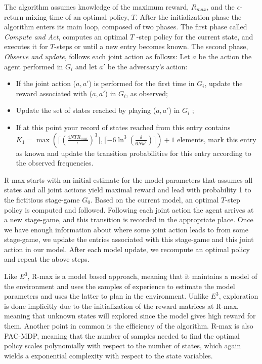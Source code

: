 The algorithm assumes knowledge of the maximum reward, $R_{max}$, and the $\epsilon$-return mixing time of an optimal policy, $T$. After the initialization phase the algorithm enters its main loop, composed of two phases. The first phase called \emph{Compute and Act}, computes an optimal $T$ -step policy for the current state, and executes it for $T$-steps or until a new entry becomes known. The second phase, \emph{Observe and update}, follows each joint action as follows: Let $a$ be the action the agent performed in $G_i$ and let $a'$ be the adversary's action:
\begin{itemize}
\item If the joint action ($a,a'$) is performed for the first time in $G_i$, update the reward associated with ($a,a'$) in $G_i$, as observed;
\item Update the set of states reached by playing ($a,a′$) in $G_i$ ;
\item If at this point your record of states reached from this entry contains \\ $K_1=\max \left( \lceil (\frac{4NTR_{max}}{\epsilon})^3 \rceil,\lceil -6 \ln^3(\frac{\delta}{6Nk^2}) \rceil \right) +1$ elements, mark this entry as known and update the transition probabilities for this entry according to the observed frequencies.
\end{itemize}
R-max starts with an initial estimate for the model parameters that assumes all states and all joint actions yield maximal reward and lead with probability 1 to the fictitious stage-game $G_0$. Based on the current model, an optimal $T$-step policy is computed and followed. Following each joint action the agent arrives at a new stage-game, and this transition is recorded in the appropriate place. Once we have enough information about where some joint action leads to from some stage-game, we update the entries associated with this stage-game and this joint action in our model. After each model update, we recompute an optimal policy and repeat the above steps.\par
Like $E^3$, R-max is a model based approach, meaning that it maintains a model of the environment and uses the samples of experience to estimate the model parameters and uses the latter to plan in the environment. Unlike $E^3$, exploration is done implicitly due to the initialization of the reward matrices at R-max, meaning that unknown states will explored since the model gives high reward for them. Another point in common is the efficiency of the algorithm. R-max is also PAC-MDP, meaning that the number of samples needed to find the optimal policy scales polynomially with respect to the number of states, which again wields a exponential complexity with respect to the state variables.
